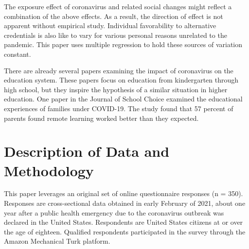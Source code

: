 \documentclass[review]{elsarticle}
\begin{document}
The exposure effect of coronavirus and related social changes might reflect a combination of the above effects.
As a result, the direction of effect is not apparent without empirical study.
Individual favorability to alternative credentials is also like to vary for various personal reasons unrelated to the pandemic.
This paper uses multiple regression to hold these sources of variation constant.

There are already several papers examining the impact of coronavirus on the education system.
These papers focus on education from kindergarten through high school,
but they inspire the hypothesis of a similar situation in higher education.
One paper in the Journal of School Choice examined the educational experiences of families under COVID-19\cite{carpenter2020we}.
The study found that 57 percent of parents found remote learning worked better than they expected.


\section{Description of Data and Methodology}

This paper leverages an original set of online questionnaire responses (n = 350).
Responses are cross-sectional data obtained in early February of 2021,
about one year after a public health emergency due to the coronavirus outbreak was declared in the United States\cite{staff_2021}.
Respondents are United States citizens at or over the age of eighteen.
Qualified respondents participated in the survey through the Amazon Mechanical Turk platform.
\end{document}
